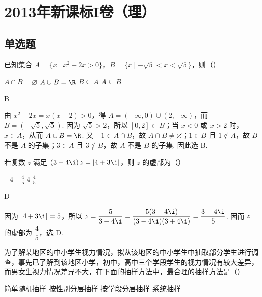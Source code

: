 \chapter{2013年新课标I卷（理）}

\section{单选题}

\begin{problem}
已知集合 \(A = \{x \mid x^2 - 2x > 0\}\)，\(B = \{x \mid -\sqrt{5} < x < \sqrt{5}\}\)，则（\quad）

\choices
    {\(A \cap B = \varnothing\)}
    {\(A \cup B = \R\)}
    {\(B \subseteq A\)}
    {\(A \subseteq B\)}
\end{problem}

\begin{answer}
B
\end{answer}

\begin{solution}
由 \(x^2-2x=x(x-2)>0\)，得 \(A=(-\infty,0)\cup(2,+\infty)\)，而 \(B=(-\sqrt{5},\sqrt{5})\). 因为 \(\sqrt{5}>2\)，所以 \([0,2]\subset B\)；当 \(x<0\) 或 \(x>2\) 时，\(x\in A\)，从而 \(A\cup B=\R\). 又 \(-1\in A\cap B\)，故 \(A\cap B\neq\varnothing\)；\(1\in B\) 且 \(1\notin A\)，故 \(B\) 不是 \(A\) 的子集；\(3\in A\) 且 \(3\notin B\)，故 \(A\) 不是 \(B\) 的子集. 因此选 B.
\end{solution}

\begin{problem}
若复数 \(z\) 满足 \(\left(3 - 4\i\right)z = \left|4 + 3\i\right|\)，则 \(z\) 的虚部为（\quad）

\choices
    {\(-4\)}
    {\(-\frac{4}{5}\)}
    {4}
    {\(\frac{4}{5}\)}
\end{problem}

\begin{answer}
D
\end{answer}

\begin{solution}
因为 \(\left|4+3\i\right|=5\)，所以
\(z=\dfrac{5}{3-4\i}=\dfrac{5(3+4\i)}{(3-4\i)(3+4\i)}=\dfrac{3+4\i}{5}\). 因而 \(z\) 的虚部为 \(\dfrac45\)，选 D.
\end{solution}

\begin{problem}
为了解某地区的中小学生视力情况，拟从该地区的中小学生中抽取部分学生进行调查，事先已了解到该地区小学，初中，高中三个学段学生的视力情况有较大差异，而男女生视力情况差异不大，在下面的抽样方法中，最合理的抽样方法是（\quad）

\choices
    {简单随机抽样}
    {按性别分层抽样}
    {按学段分层抽样}
    {系统抽样}
\end{problem}

